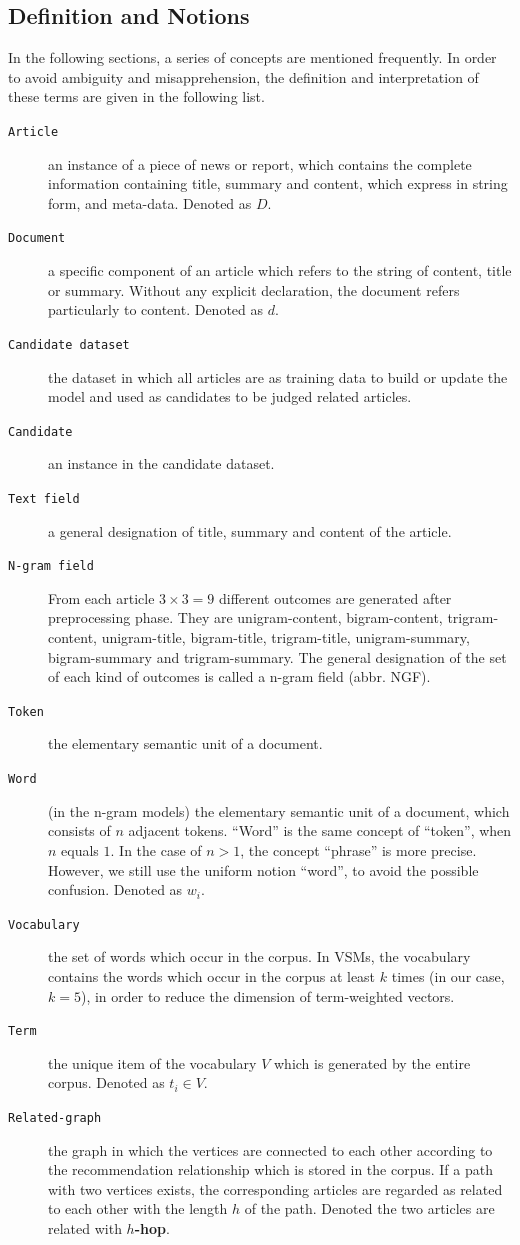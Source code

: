 \subsection{Definition and Notions}
\label{sec:4.2}

In the following sections, a series of concepts are mentioned frequently. In order to avoid ambiguity and misapprehension, the definition and interpretation of these terms are given in the following list.

\begin{description}
\item[\texttt{Article}] an instance of a piece of news or report, which contains the complete information containing title, summary and content, which express in string form, and meta-data. Denoted as $D$.
\item[\texttt{Document}] a specific component of an article which refers to the string of content, title or summary. Without any explicit declaration, the document refers particularly to content. Denoted as $d$.
\item[\texttt{Candidate dataset}] the dataset in which all articles are as training data to build or update the model and used as candidates to be judged related articles. 
\item[\texttt{Candidate}] an instance in the candidate dataset.
\item[\texttt{Text field}] a general designation of title, summary and content of the article. 
\item[\texttt{N-gram field}] From each article $3\times3=9$ different outcomes are generated after preprocessing phase. They are unigram-content, bigram-content, trigram-content, unigram-title, bigram-title, trigram-title, unigram-summary, bigram-summary and trigram-summary. The general designation of the set of each kind of outcomes is called a n-gram field (abbr. NGF). 
\item[\texttt{Token}] the elementary semantic unit of a document.
\item[\texttt{Word}] (in the n-gram models) the elementary semantic unit of a document, which consists of $n$ adjacent tokens. ``Word'' is the same concept of ``token'', when $n$ equals $1$. In the case of $n > 1$, the concept ``phrase'' is more precise. However, we still use the uniform notion ``word'', to avoid the possible confusion. Denoted as $w_i$. 
\item[\texttt{Vocabulary}] the set of words which occur in the corpus. In VSMs, the vocabulary contains the words which occur in the corpus at least $k$ times (in our case, $k=5$), in order to reduce the dimension of term-weighted vectors. 
\item[\texttt{Term}] the unique item of the vocabulary $V$ which is generated by the entire corpus. Denoted as $t_i \in V$. 
\item[\texttt{Related-graph}] the graph in which the vertices are connected to each other according to the recommendation relationship which is stored in the corpus. If a path with two vertices exists, the corresponding articles are regarded as related to each other with the length $h$ of the path. Denoted the two articles are related with \textbf{$h$-hop}.


\end{description}

